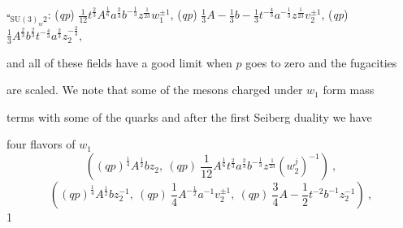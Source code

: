 \documentclass[a4paper,12pt]{article}
\begin{document}
$\square _{\mathrm{S}\mathrm{U}(3)_{w}2}$: ({\it qp}) $\displaystyle \frac{1}{12}t^{\frac{2}{3}}A^{\frac{1}{6}}a^{\frac{2}{3}}b^{-\frac{1}{3}}z^{\frac{1}{23}}w_{1}^{\pm 1}$, ({\it qp}) $\displaystyle \frac{1}{3}A-\frac{1}{3}b-\frac{1}{3}t^{-\frac{4}{3}}a^{-\frac{1}{3}}z^{\frac{1}{23}}v_{2}^{\pm 1}$, ({\it qp}) $\displaystyle \frac{1}{3}A^{\frac{2}{3}}b^{\frac{2}{3}}t^{-\frac{4}{3}}a^{\frac{2}{3}}z_{2}^{-\frac{2}{3}},$

and all of these fields have a good limit when $p$ goes to zero and the fugacities

are scaled. We note that some of the mesons charged under $w_{1}$ form mass

terms with some of the quarks and after the first Seiberg duality we have

four flavors of $w_{1}$
$$
((qp)^{\frac{1}{4}}A^{\frac{1}{2}}bz_{2},\ (qp)\ \frac{1}{12}A^{\frac{1}{6}}t^{\frac{2}{3}}a^{\frac{2}{3}}b^{-\frac{1}{3}}z^{\frac{1}{23}}(w_{2}^{j})^{-1})\ ,
$$
$$
((qp)^{\frac{1}{4}}A^{\frac{1}{2}}bz_{2}^{-1},\ (qp)\ \frac{1}{4}A^{-\frac{1}{2}}a^{-1}v_{2}^{\pm 1},\ (qp)\ \frac{3}{4}A-\frac{1}{2}t^{-2}b^{-1}z_{2}^{-1})\ ,
$$
1
\end{document}

